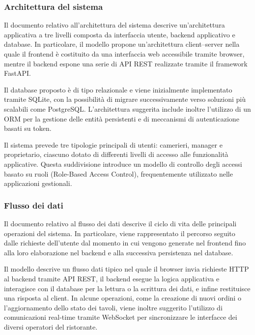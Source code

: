 \subsubsection{Architettura del sistema}

Il documento relativo all'architettura del sistema descrive un'architettura applicativa a tre livelli composta da interfaccia utente, backend applicativo e database. In particolare, il modello propone un'architettura client--server nella quale il frontend è costituito da una interfaccia web accessibile tramite browser, mentre il backend espone una serie di API REST realizzate tramite il framework FastAPI.

Il database proposto è di tipo relazionale e viene inizialmente implementato tramite SQLite, con la possibilità di migrare successivamente verso soluzioni più scalabili come PostgreSQL. L'architettura suggerita include inoltre l'utilizzo di un ORM per la gestione delle entità persistenti e di meccanismi di autenticazione basati su token.

Il sistema prevede tre tipologie principali di utenti: camerieri, manager e proprietario, ciascuno dotato di differenti livelli di accesso alle funzionalità applicative. Questa suddivisione introduce un modello di controllo degli accessi basato su ruoli (Role-Based Access Control), frequentemente utilizzato nelle applicazioni gestionali.

\subsubsection{Flusso dei dati}

Il documento relativo al flusso dei dati descrive il ciclo di vita delle principali operazioni del sistema. In particolare, viene rappresentato il percorso seguito dalle richieste dell'utente dal momento in cui vengono generate nel frontend fino alla loro elaborazione nel backend e alla successiva persistenza nel database.

Il modello descrive un flusso dati tipico nel quale il browser invia richieste HTTP al backend tramite API REST, il backend esegue la logica applicativa e interagisce con il database per la lettura o la scrittura dei dati, e infine restituisce una risposta al client. In alcune operazioni, come la creazione di nuovi ordini o l'aggiornamento dello stato dei tavoli, viene inoltre suggerito l'utilizzo di comunicazioni real-time tramite WebSocket per sincronizzare le interfacce dei diversi operatori del ristorante.

